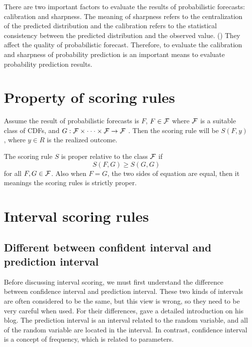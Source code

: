 \documentclass{monashthesis}
\theoremstyle{definition}
\theoremstyle{definition}
\theoremstyle{definition}
\theoremstyle{remark}
\begin{document}
There are two important factors to evaluate the results of probabilistic
forecasts: calibration and sharpness. The meaning of sharpness refers to
the centralization of the predicted distribution and the calibration
refers to the statistical consistency between the predicted distribution
and the observed value. (\textcite{GBR07}) They affect the quality of
probabilistic forecast. Therefore, to evaluate the calibration and
sharpness of probability prediction is an important means to evaluate
probability prediction results.

\section{Property of scoring rules}\label{property-of-scoring-rules}

Assume the result of probabilistic forecasts is \(F\), \(F \in \cal{F}\)
where \(\cal{F}\) is a suitable class of CDFs, and
\(G:\cal{F\times\cdot\cdot\cdot\times F\to F}\) . Then the scoring rule
will be \(S(F,y)\), where \(y \in R\) is the realized outcome.

The scoring rule \(S\) is proper relative to the class \(\cal{F}\) if
\[S(F,G)\geq S(G,G)\] for all \(F,G \in \cal{F}\). Also when \(F=G\),
the two sides of equation are equal, then it meanings the scoring rules
is strictly proper.

\section{Interval scoring rules}\label{interval-scoring-rules}

\subsection{Different between confident interval and prediction
interval}\label{different-between-confident-interval-and-prediction-interval}

Before discussing interval scoring, we must first understand the
difference between confidence interval and prediction interval. These
two kinds of intervals are often considered to be the same, but this
view is wrong, so they need to be very careful when used. For their
differences, \textcite{RH13} gave a detailed introduction on his blog.
The prediction interval is an interval related to the random variable,
and all of the random variable are located in the interval. In contrast,
confidence interval is a concept of frequency, which is related to
parameters.
\end{document}
